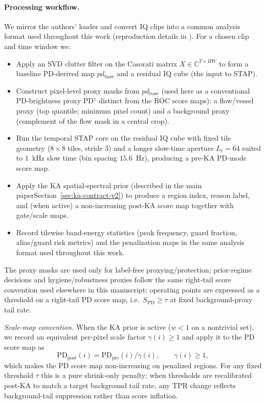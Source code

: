 \paragraph{Processing workflow.}
We mirror the authors' loader and convert IQ clips into a common analysis format used throughout this work (reproduction details in ). For a chosen clip and time window we:
\begin{itemize}[nosep]
  \item Apply an SVD clutter filter on the Casorati matrix $X\in\mathbb{C}^{T\times HW}$ to form a baseline PD-derived map $pd_{\mathrm{base}}$ and a residual IQ cube (the input to STAP).
  \item Construct pixel-level proxy masks from $pd_{\mathrm{base}}$ (used here as a conventional PD-brightness proxy $\mathrm{PD}^{\uparrow}$ distinct from the ROC score maps): a flow/vessel proxy (top quantile; minimum pixel count) and a background proxy (complement of the flow mask in a central crop).
  \item Run the temporal STAP core on the residual IQ cube with fixed tile geometry ($8\times 8$ tiles, stride 3) and a longer slow-time aperture $L_t=64$ suited to $1$~kHz slow time (bin spacing $15.6$~Hz), producing a pre-KA PD-mode score map.
  \item Apply the KA spatial-spectral prior (\ifSTAPSUPPLEMENTONLY described in the main paper\else Section~\ref{sec:ka-contract-v2}\fi) to produce a region index, reason label, and (when active) a non-increasing post-KA score map together with gate/scale maps.
  \item Record tilewise band-energy statistics (peak frequency, guard fraction, alias/guard risk metrics) and the penalization maps in the same analysis format used throughout this work.
\end{itemize}
The proxy masks are used only for label-free proxying/protection; prior-regime decisions and hygiene/robustness proxies follow the same right-tail score convention used elsewhere in this manuscript: operating points are expressed as a threshold on a right-tail PD score map, i.e.\ $S_{\mathrm{PD}}\ge\tau$ at fixed background-proxy tail rate.

\emph{Scale-map convention.} When the KA prior is active ($w<1$ on a nontrivial set), we record an equivalent per-pixel scale factor $\gamma(i)\ge 1$ and apply it to the PD score map as
\[
\mathrm{PD}_{\mathrm{post}}(i)=\mathrm{PD}_{\mathrm{pre}}(i)/\gamma(i),\qquad \gamma(i)\ge 1,
\]
which makes the PD score map non-increasing on penalized regions. For any fixed threshold $\tau$ this is a pure shrink-only penalty; when thresholds are recalibrated post-KA to match a target background tail rate, any TPR change reflects background-tail suppression rather than score inflation.

